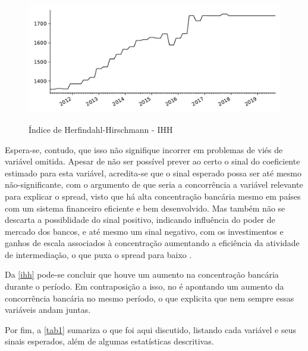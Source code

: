 \documentclass[a4paper,
               article,
               12pt,
               openany,
               oneside,
               english,
               brazil]{abntex2}
\numberwithin{equation}{section}
\begin{document}
    \begin{figure}[h]
        \centering
        \caption{Índice de Herfindahl-Hirschmann - IHH}
        \includegraphics[width = \textwidth, scale=0.75]{ihh.pdf}
        \label{ihh}
    \end{figure}

    Espera-se, contudo, que isso não signifique incorrer em problemas de viés de variável omitida. Apesar de não ser possível prever ao certo o sinal do coeficiente estimado para esta variável, acredita-se que o sinal esperado possa ser até mesmo não-significante, com o argumento de que seria a concorrência a variável relevante para explicar o spread, visto que há alta concentração bancária mesmo em países com um sistema financeiro eficiente e bem desenvolvido. Mas também não se descarta a possiblidade do sinal positivo, indicando influência do poder de mercado dos bancos, e até mesmo um sinal negativo, com os investimentos e ganhos de escala associados à concentração aumentando a eficiência da atividade de intermediação, o que puxa o spread para baixo \cite{reb2017}. 

    Da \autoref{ihh} pode-se concluir que houve um aumento na concentração bancária durante o período. Em contraposição a isso, no \textcite[11]{reb2017} é apontando um aumento da concorrência bancária no mesmo período, o que explicita que nem sempre essas variáveis andam juntas.

    Por fim, a \autoref{tab1} sumariza o que foi aqui discutido, listando cada variável e seus sinais esperados, além de algumas estatísticas descritivas.
\end{document}
